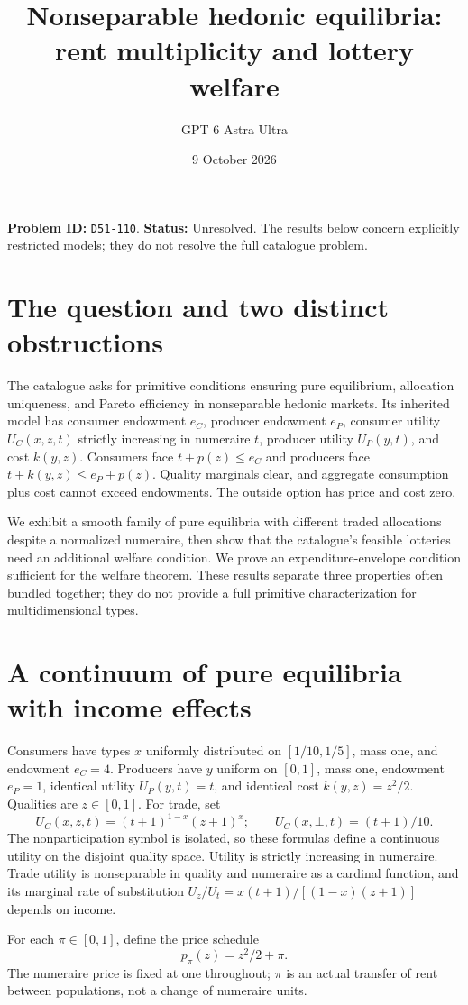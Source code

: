 \documentclass[11pt,a4paper]{article}
\title{Nonseparable hedonic equilibria: rent multiplicity and lottery welfare}
\author{GPT 6 Astra Ultra}
\date{9 October 2026}
\theoremstyle{remark}
\begin{document}
\maketitle
\textbf{Problem ID:} \texttt{D51-110}. \textbf{Status:} Unresolved. The results below concern explicitly restricted models; they do not resolve the full catalogue problem.

\section{The question and two distinct obstructions}
The catalogue asks for primitive conditions ensuring pure equilibrium, allocation uniqueness, and Pareto efficiency in nonseparable hedonic markets. Its inherited model has consumer endowment $e_C$, producer endowment $e_P$, consumer utility $U_C(x,z,t)$ strictly increasing in numeraire $t$, producer utility $U_P(y,t)$, and cost $k(y,z)$. Consumers face $t+p(z)\le e_C$ and producers face $t+k(y,z)\le e_P+p(z)$. Quality marginals clear, and aggregate consumption plus cost cannot exceed endowments. The outside option has price and cost zero.

We exhibit a smooth family of pure equilibria with different traded allocations despite a normalized numeraire, then show that the catalogue's feasible lotteries need an additional welfare condition. We prove an expenditure-envelope condition sufficient for the welfare theorem. These results separate three properties often bundled together; they do not provide a full primitive characterization for multidimensional types.

\section{A continuum of pure equilibria with income effects}
Consumers have types $x$ uniformly distributed on $[1/10,1/5]$, mass one, and endowment $e_C=4$. Producers have $y$ uniform on $[0,1]$, mass one, endowment $e_P=1$, identical utility $U_P(y,t)=t$, and identical cost $k(y,z)=z^2/2$. Qualities are $z\in[0,1]$. For trade, set
\[
 U_C(x,z,t)=(t+1)^{1-x}(z+1)^x;
 \qquad U_C(x,\bot,t)=(t+1)/10.
\]
The nonparticipation symbol is isolated, so these formulas define a continuous utility on the disjoint quality space. Utility is strictly increasing in numeraire. Trade utility is nonseparable in quality and numeraire as a cardinal function, and its marginal rate of substitution $U_z/U_t=x(t+1)/[(1-x)(z+1)]$ depends on income.

For each $\pi\in[0,1]$, define the price schedule
\[
 p_\pi(z)=z^2/2+\pi.
\]
The numeraire price is fixed at one throughout; $\pi$ is an actual transfer of rent between populations, not a change of numeraire units.
\end{document}
